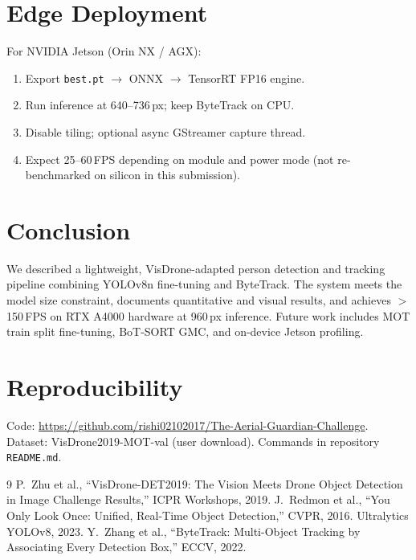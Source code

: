 \documentclass[10pt,twocolumn,letterpaper]{article}
\begin{document}
\section{Edge Deployment}
\label{sec:edge}
For NVIDIA Jetson (Orin NX / AGX):
\begin{enumerate}[leftmargin=*, nosep]
    \item Export \texttt{best.pt} $\rightarrow$ ONNX $\rightarrow$ TensorRT FP16 engine.
    \item Run inference at 640--736\,px; keep ByteTrack on CPU.
    \item Disable tiling; optional async GStreamer capture thread.
    \item Expect 25--60\,FPS depending on module and power mode (not re-benchmarked on silicon in this submission).
\end{enumerate}

\section{Conclusion}
We described a lightweight, VisDrone-adapted person detection and tracking pipeline combining YOLOv8n fine-tuning and ByteTrack. The system meets the model size constraint, documents quantitative and visual results, and achieves $>$150\,FPS on RTX A4000 hardware at 960\,px inference. Future work includes MOT train split fine-tuning, BoT-SORT GMC, and on-device Jetson profiling.

\section*{Reproducibility}
Code: \url{https://github.com/rishi02102017/The-Aerial-Guardian-Challenge}. Dataset: VisDrone2019-MOT-val (user download). Commands in repository \texttt{README.md}.

{\small

\begin{thebibliography}{9}
P.~Zhu et al., ``VisDrone-DET2019: The Vision Meets Drone Object Detection in Image Challenge Results,'' ICPR Workshops, 2019.
J.~Redmon et al., ``You Only Look Once: Unified, Real-Time Object Detection,'' CVPR, 2016. Ultralytics YOLOv8, 2023.
Y.~Zhang et al., ``ByteTrack: Multi-Object Tracking by Associating Every Detection Box,'' ECCV, 2022.
\end{thebibliography}
}
\end{document}
